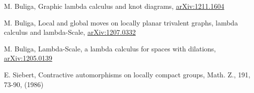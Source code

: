 \documentclass{article}
\begin{document}
\begin{thebibliography}{99}

 M. Buliga, Graphic lambda calculus and knot diagrams, \href{http://arxiv.org/abs/1211.1604}{arXiv:1211.1604}


 M. Buliga, Local and global moves on locally planar trivalent graphs, lambda calculus and lambda-Scale, \href{http://arxiv.org/abs/1207.0332}{arXiv:1207.0332} 

 M. Buliga, Lambda-Scale, a lambda calculus for spaces with dilations,  \href{http://arxiv.org/abs/1205.0139}{arXiv:1205.0139}


 E. Siebert, Contractive automorphisms on locally compact groups, Math. Z., 191, 73-90, (1986)


\end{thebibliography}
\end{document}
